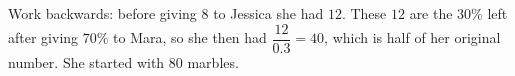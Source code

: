 Work backwards: before giving $8$ to Jessica she had $12$. These $12$ are the $30\%$ left after giving $70\%$ to Mara, so she then had $\dfrac{12}{0.3}=40$, which is half of her original number. She started with $\boxed{80}$ marbles.
